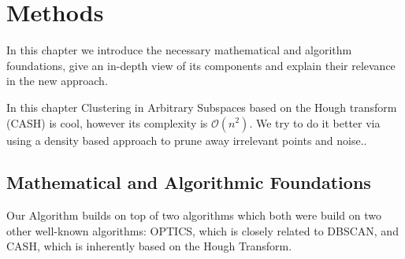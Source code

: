 \chapter{Methods}\label{ch:Methods}
In this chapter we introduce the necessary mathematical and algorithm foundations, give an in-depth view of its components and explain their relevance in the new approach.

In this chapter 
Clustering in Arbitrary Subspaces based on the Hough transform (CASH) is cool, however its complexity is $\mathcal{O}(n^2)$.
We try to do it better via using a density based approach to prune away irrelevant points and noise..

\section{Mathematical and Algorithmic Foundations}
\label{sec:Foundations}
Our Algorithm builds on top of two algorithms which both were build on two other well-known algorithms: OPTICS, which is closely related to DBSCAN, and CASH, which is inherently based on the Hough Transform.
